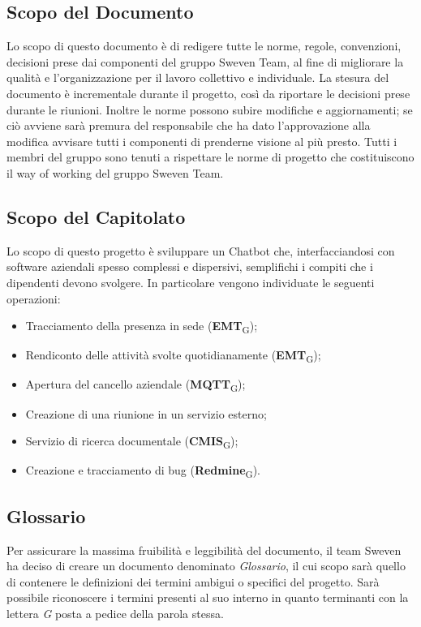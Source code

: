 \subsection{Scopo del Documento}
Lo scopo di questo documento è di redigere tutte le norme, regole, convenzioni, decisioni 
prese dai componenti del gruppo Sweven Team, al fine di migliorare la qualità e l'organizzazione
per il lavoro collettivo e individuale. \newline
La stesura del documento è incrementale durante il progetto, così da riportare le decisioni
prese durante le riunioni. Inoltre le norme possono subire modifiche e aggiornamenti;
se ciò avviene sarà premura del responsabile che ha dato l'approvazione alla modifica 
avvisare tutti i componenti di prenderne visione al più presto. \newline 
Tutti i membri del gruppo sono tenuti a rispettare le norme di progetto che costituiscono
il way of working del gruppo Sweven Team.

\subsection{Scopo del Capitolato}
Lo scopo di questo progetto è sviluppare un Chatbot che, interfacciandosi con software aziendali spesso 
complessi e dispersivi, semplifichi i compiti che i dipendenti devono svolgere. In particolare vengono 
individuate le seguenti operazioni: 
\begin{itemize}
	\item Tracciamento della presenza in sede (\textbf{EMT}\textsubscript{G});
	\item Rendiconto delle attività svolte quotidianamente (\textbf{EMT}\textsubscript{G});
	\item Apertura del cancello aziendale (\textbf{MQTT}\textsubscript{G});
	\item Creazione di una riunione in un servizio esterno;
	\item Servizio di ricerca documentale (\textbf{CMIS}\textsubscript{G});
	\item Creazione e tracciamento di bug (\textbf{Redmine}\textsubscript{G}).
\end{itemize}

\subsection{Glossario}
Per assicurare la massima fruibilità e leggibilità del documento, il team Sweven ha deciso di creare un 
documento denominato \textit{Glossario}, il cui scopo sarà quello di contenere le definizioni dei termini 
ambigui o specifici del progetto. Sarà possibile riconoscere i termini presenti al suo interno in quanto 
terminanti con la lettera \textit{G} posta a pedice della parola stessa. 
